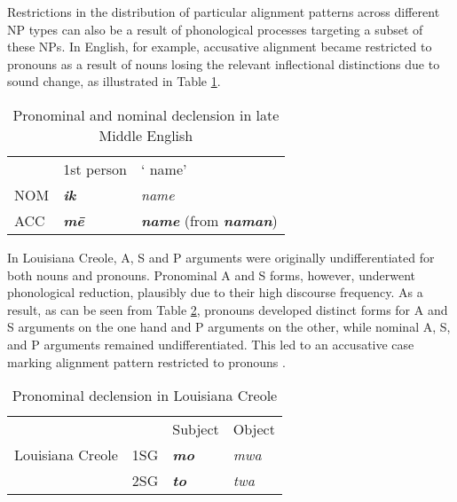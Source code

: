 \documentclass[output=paper]{langsci/langscibook}
\begin{document}
\z

Restrictions in the distribution of particular
alignment patterns across different NP types can also be a result of
phonological processes targeting a subset of these
NPs. 
In English, for example, accusative alignment
  became restricted to pronouns as a result of nouns losing the
  relevant inflectional distinctions due to sound change, as illustrated in Table
  \ref{blake}. 



\begin{table}
  
    \begin{tabular}{lll}
 &1st person&` name'\\
      NOM&\textbf{\textit{ik}} &{\em name}\\
      ACC &\textbf{\textit{mē}} &\textbf{\textit{name}} (from \textbf{\textit{naman}})\\
      
\end{tabular}
  
\caption{Pronominal and nominal declension in late Middle English \protect{} \label{blake}}
\end{table}

In Louisiana Creole, A, S and P arguments were originally
undifferentiated for both nouns and pronouns. Pronominal A and S forms,
however, underwent phonological reduction, plausibly due to their high discourse frequency. As a result, as can be seen from Table \ref{apics}, pronouns developed
 distinct forms for A and S
    arguments on the one hand and P arguments on the other, while nominal A, S, and P arguments
    remained undifferentiated. This led to an accusative case marking
    alignment pattern restricted to pronouns \citep{HaspelmathAPiCS}.
   

\begin{table}
  
\begin{tabular}{llll}
 & &Subject &Object\\
 Louisiana Creole &1SG &\textbf{\textit{mo}} &{\em mwa}\\
 &2SG &\textbf{\textit{to}} &{\em twa}\\
\end{tabular}
  
  \caption{Pronominal declension in Louisiana Creole \citep{HaspelmathAPiCS}}\label{apics}
  \end{table}
\end{document}
